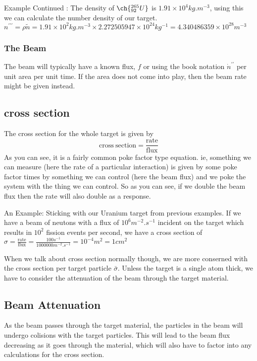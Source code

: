 \begin{framed}
  Example Continued : The density of $\ch{^{265}_{92}U}$ is $1.91 \times 10^4 kg.m^{-3}$, using this we can calculate the number density of our target.
  $n^{\prime\prime\prime}=\rho \tilde{n} = 1.91\times10^2 kg.m^{-3} \times 2.272505947\times10^{24}kg^{-1} = 4.340486359\times10^{28} m^{-3}$
\end{framed}

\subsubsection{The Beam}
The beam will typically have a known flux, $f$ or using the book notation $\dot{n}^{\prime\prime}$ per unit area per unit time. If the area does not come into play, then the beam rate might be given instead.

\subsection{cross section}
The cross section for the whole target is given by
\begin{equation}
  \label{eq:target_cross_section}
\mathrm{cross\:section} = \frac{\mathrm{rate}}{\mathrm{flux}}
\end{equation}
As you can see, it is a fairly common poke factor type equation. ie, something we can measure (here the rate of a particular interaction) is given by some poke factor times by something we can control (here the beam flux) and we poke the system with the thing we can control. So as you can see, if we double the beam flux then the rate will also double as a response.

\begin{framed}
  An Example: Sticking with our Uranium target from previous examples. If we have a beam of neutons with a flux of $10^{6}m^{-2}.s^{-1}$ incident on the target which results in $10^{2}$ fission events per second, we have a cross section of $\sigma = \frac{\mathrm{rate}}{\mathrm{flux}}=\frac{100s^{-1}}{1000000m^{-2}.s^{-1}}=10^{-4}m^{2}=1cm^{2}$
\end{framed}

When we talk about cross section normally though, we are more conserned with the cross section per target particle $\bar{\sigma}$. Unless the target is a single atom thick, we have to consider the attenuation of the beam through the target material.

\subsection{Beam Attenuation}
As the beam passes through the target material, the particles in the beam will undergo colisions with the target particles. This will lead to the beam flux decreasing as it goes through the material, which will also have to factor into any calculations for the cross section.

